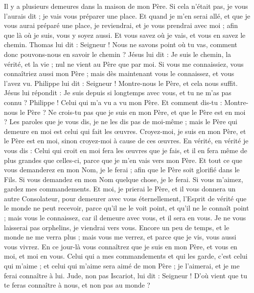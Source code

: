 \begin{multicols}{2}
Il y a plusieurs demeures dans la maison de mon Père. Si cela n'était pas, je vous l'aurais dit ; je vais vous préparer une place.
Et quand je m'en serai allé, et que je vous aurai préparé une place, je reviendrai, et je vous prendrai avec moi ; afin que là où je suis, vous y soyez aussi.
Et vous savez où je vais, et vous en savez le chemin.
Thomas lui dit : Seigneur ! Nous ne savons point où tu vas, comment donc pouvons-nous en savoir le chemin ?
Jésus lui dit : Je suis le chemin, la vérité, et la vie ; nul ne vient au Père que par moi.
Si vous me connaissiez, vous connaîtriez aussi mon Père ; mais dès maintenant vous le connaissez, et vous l'avez vu.
Philippe lui dit : Seigneur ! Montre-nous le Père, et cela nous suffit.
Jésus lui répondit : Je suis depuis si longtemps avec vous, et tu ne m'as pas connu ? Philippe ! Celui qui m'a vu a vu mon Père. Et comment dis-tu : Montre-nous le Père ?
Ne crois-tu pas que je suis en mon Père, et que le Père est en moi ? Les paroles que je vous dis, je ne les dis pas de moi-même ; mais le Père qui demeure en moi est celui qui fait les œuvres.
Croyez-moi, je suis en mon Père, et le Père est en moi, sinon croyez-moi à cause de ces œuvres.
En vérité, en vérité je vous dis : Celui qui croit en moi fera les œuvres que je fais, et il en fera même de plus grandes que celles-ci, parce que je m'en vais vers mon Père.
Et tout ce que vous demanderez en mon Nom, je le ferai ; afin que le Père soit glorifié dans le Fils.
Si vous demandez en mon Nom quelque chose, je le ferai.
Si vous m'aimez, gardez mes commandements.
Et moi, je prierai le Père, et il vous donnera un autre Consolateur, pour demeurer avec vous éternellement,
l'Esprit de vérité que le monde ne peut recevoir, parce qu'il ne le voit point, et qu'il ne le connaît point ; mais vous le connaissez, car il demeure avec vous, et il sera en vous.
Je ne vous laisserai pas orphelins, je viendrai vers vous.
Encore un peu de temps, et le monde ne me verra plus ; mais vous me verrez, et parce que je vis, vous aussi vous vivrez.
En ce jour-là vous connaîtrez que je suis en mon Père, et vous en moi, et moi en vous.
Celui qui a mes commandements et qui les garde, c'est celui qui m'aime ; et celui qui m'aime sera aimé de mon Père ; je l'aimerai, et je me ferai connaître à lui.
Jude, non pas Iscariot, lui dit : Seigneur ! D'où vient que tu te feras connaître à nous, et non pas au monde ?

\end{multicols}

